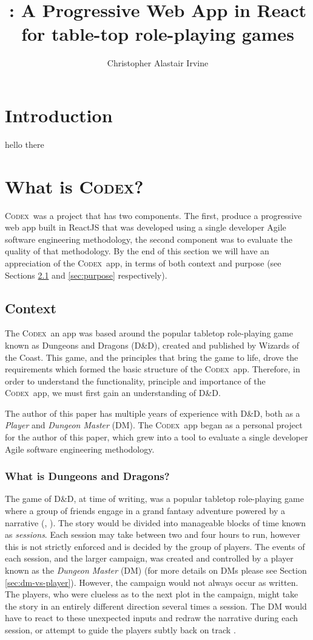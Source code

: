 \documentclass[final]{cmpreport}
\title{\Codex: A Progressive Web App in React for table-top role-playing games}
\author{Christopher Alastair Irvine}
\newcommand{\WotC}{Wizards of the Coast}
\newcommand{\dnd}{D\&D}
\newcommand{\Codex}{\textsc{Codex}}
\begin{document}
	
	\section{Introduction} \label{sec:introduction}
	hello there
	
	\section{What is \Codex?} \label{sec:what-codex}
	\Codex \ was a project that has two components. The first, produce a progressive web app built in ReactJS that was developed using a single developer Agile software engineering methodology, the second component was to evaluate the quality of that methodology. By the end of this section we will have an appreciation of the \Codex \ app, in terms of both context and purpose (see Sections \ref{sec:context} and \ref{sec:purpose} respectively).
	
		\subsection{Context} \label{sec:context}
		The \Codex \ an app was based around the popular tabletop role-playing game known as Dungeons and Dragons (\dnd), created and published by \WotC. This game, and the principles that bring the game to life, drove the requirements which formed the basic structure of the \Codex \ app. Therefore, in order to understand the functionality, principle and importance of the \Codex \ app, we must first gain an understanding of \dnd. 
		
		The author of this paper has multiple years of experience with \dnd, both as a \emph{Player} and \emph{Dungeon Master} (DM). The \Codex \ app began as a personal project for the author of this paper, which grew into a tool to evaluate a single developer Agile software engineering methodology. 
		
			\subsubsection{What is Dungeons and Dragons?} \label{sec:what-dnd}
			The game of \dnd, at time of writing, was a popular tabletop role-playing game where a group of friends engage in a grand fantasy adventure powered by a narrative (\cite{DnDOriginal}, \cite{DnDHistory}). The story would be divided into manageable blocks of time known as \emph{sessions}. Each session may take between two and four hours to run, however this is not strictly enforced and is decided by the group of players. The events of each session, and the larger campaign, was created and controlled by a player known as the \emph{Dungeon Master} (DM) (for more details on DMs please see Section \ref{sec:dm-vs-player}). However, the campaign would not always occur as written. The players, who were clueless as to the next plot in the campaign, might take the story in an entirely different direction several times a session. The DM would have to react to these unexpected inputs and redraw the narrative during each session, or attempt to guide the players subtly back on track \citep{PlayerHandbook}. 
			
\end{document}
